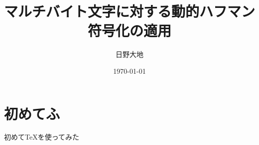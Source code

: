 \documentclass[dvipdfmx,uplatex]{jsarticle}
\title{マルチバイト文字に対する動的ハフマン符号化の適用}
\author{日野大地}
\date{\today}
\begin{document}
\maketitle
\section{初めてふ}
初めてTeXを使ってみた
\end{document}
